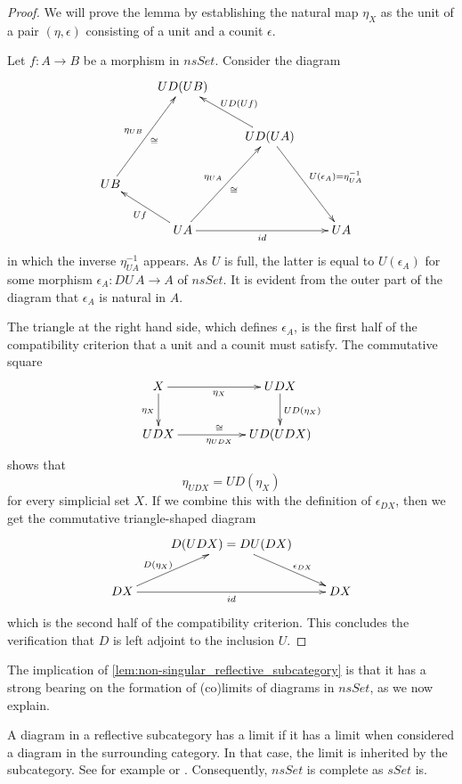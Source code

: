 \begin{proof}
We will prove the lemma by establishing the natural map $\eta _X$ as the unit of a pair $(\eta ,\epsilon )$ consisting of a unit and a counit $\epsilon$.

Let $f:A\to B$ be a morphism in $nsSet$. Consider the diagram
\begin{displaymath}
 \xymatrix{
 & UD(UB) \\
 && UD(UA) \ar[lu]_{UD(Uf)} \ar[ddr]^{U(\epsilon _A)=\eta ^{-1}_{UA}} \\
 UB \ar[uur]_\cong ^{\eta _{UB}} \\
 & UA \ar[lu]^{Uf} \ar[uur]_\cong ^{\eta _{UA} } \ar[rr]_{id} && UA
 }
\end{displaymath}
in which the inverse $\eta ^{-1}_{UA}$ appears. As $U$ is full, the latter is equal to $U(\epsilon _A)$ for some morphism $\epsilon _A:DU\, A\to A$ of $nsSet$. It is evident from the outer part of the diagram that $\epsilon _A$ is natural in $A$.

The triangle at the right hand side, which defines $\epsilon _A$, is the first half of the compatibility criterion that a unit and a counit must satisfy. The commutative square
\begin{displaymath}
\xymatrix{
 X \ar[d]_{\eta _X} \ar[rr]_{\eta _X} && UDX \ar[d]^{UD(\eta _X)} \\
 UDX \ar[rr]_{\eta _{UDX}}^\cong && UD(UDX)
}
 \end{displaymath}
shows that
\[\eta _{UDX}=UD(\eta _X)\]
for every simplicial set $X$. If we combine this with the definition of $\epsilon _{DX}$, then we get the commutative triangle-shaped diagram
\begin{displaymath}
\xymatrix{
& D(UDX)=DU(DX) \ar[dr]^(.6){\epsilon _{DX}} \\
DX \ar[ur]^(.4){D(\eta _X)} \ar[rr]_{id} && DX
}
\end{displaymath}
which is the second half of the compatibility criterion. This concludes the verification that $D$ is left adjoint to the inclusion $U$.
\end{proof}
\noindent The implication of \cref{lem:non-singular_reflective_subcategory} is that it has a strong bearing on the formation of (co)limits of diagrams in $nsSet$, as we now explain.

A diagram in a reflective subcategory has a limit if it has a limit when considered a diagram in the surrounding category. In that case, the limit is inherited by the subcategory. See for example \cite[p.~92]{ML98} or \cite[p.~1306]{AR15}. Consequently, $nsSet$ is complete as $sSet$ is.

